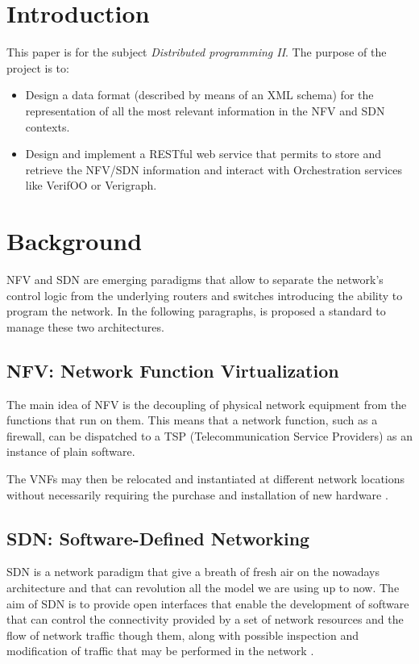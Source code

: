 \documentclass[11pt, english]{article}
\begin{document}
\tableofcontents
\newpage

\section{Introduction}
This paper is for the subject \textit{Distributed programming II}. The purpose of the project is to:
\begin{itemize}
    \item Design a data format (described by means of an XML schema) for the representation of all the most relevant information in the NFV and SDN contexts.
    \item Design and implement a RESTful web service that permits to store and retrieve the NFV/SDN information and interact with Orchestration services like VerifOO or Verigraph.
\end{itemize}

\section{Background}
NFV and SDN are emerging paradigms that allow to separate the network’s control logic from the underlying routers and switches introducing the ability to program the network. In the following paragraphs, is proposed a standard to manage these two architectures.

\subsection{NFV: Network Function Virtualization}
The main idea of NFV is the decoupling of physical network equipment from the functions that run on them. This means that a network function, such as a firewall, can be dispatched to a TSP (Telecommunication Service Providers) as an instance of plain software.

The VNFs may then be relocated and instantiated at different network locations without necessarily requiring the purchase and installation of new hardware \cite{nfv_architecture}.

\subsection{SDN: Software-Defined Networking}
SDN is a network paradigm that give a breath of fresh air on the nowadays architecture and that can revolution all the model we are using up to now. The aim of SDN is to provide open interfaces that enable the development of software that can control the connectivity provided by a set of network resources and the flow of network traffic though them, along with possible inspection and modification of traffic that may be performed in the network \cite{sdn_architecture}.
\end{document}
